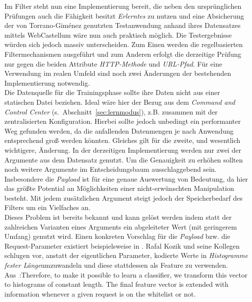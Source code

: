 Im Filter steht nun eine Implementierung bereit, die neben den ursprünglichen Prüfungen auch die Fähigkeit besitzt \emph{Erlerntes} zu nutzen und eine Absicherung der von Torrano-Giménez genutzten Testanwendung anhand ihres Datensatzes mittels WebCastellum wäre nun auch praktisch möglich. Die Testergebnisse würden sich jedoch massiv unterscheiden. Zum Einen werden die regelbasierten Filtermechanismen ausgeführt und zum Anderen erfolgt die derzeitige Prüfung nur gegen die beiden Attribute \emph{HTTP-Methode} und \emph{URL-Pfad}. Für eine Verwendung im realen Umfeld sind noch zwei Änderungen der bestehenden Implementierung notwendig.\\

Die Datenquelle für die Trainingsphase sollte ihre Daten nicht aus einer statischen Datei beziehen. Ideal wäre hier der Bezug aus dem \emph{Command and Control Center} (s.~Abschnitt~\ref{sec:lernmodus}), z.B. zusammen mit der zentralisierten Konfiguration. Hierbei sollte jedoch unbedingt ein performanter Weg gefunden werden, da die anfallenden Datenmengen je nach Anwendung entsprechend groß werden könnten. Gleiches gilt für die zweite, und wesentlich wichtigere, Änderung. In der derzeitigen Implementierung werden nur zwei der Argumente aus dem Datensatz genutzt. Um die Genauigkeit zu erhöhen sollten noch weitere Argumente im Entscheidungsbaum ausschlaggebend sein. Insbesondere die \emph{Payload} ist für eine genaue Auswertung von Bedeutung, da hier das größte Potential an Möglichkeiten einer nicht-erwünschten Manipulation besteht. Mit jedem zusätzlichen Argument steigt jedoch der Speicherbedarf des Filters um ein Vielfaches an.\\
Dieses Problem ist bereits bekannt und kann gelöst werden indem statt der zahlreichen Varianten eines Arguments ein abgeleiteter Wert (mit geringerem Umfang) genutzt wird. Einen konkreten Vorschlag für die \emph{Payload} bzw. die Request-Parameter existiert beispielsweise in \cite{kozik2014}. Rafal Kozik und seine Kollegen schlugen vor, anstatt der eigentlichen Parameter, kodierte Werte in \glqq\emph{Histogramme fester Länge}\grqq umzuwandeln und diese stattdessen als Feature zu verwenden.\\

\textcolor{bhtGray}{ Aus~\cite{kozik2014}:}Therefore, to make it possible to learn a classifier, we transform this vector to histograms of constant length. The final feature vector is extended with information whenever a given request is on the whitelist or not.\\

